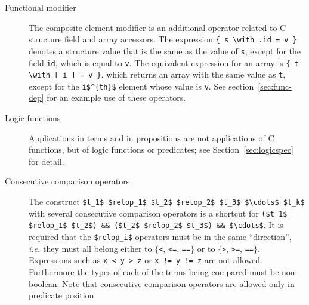 \begin{description}
\item[Functional modifier]
  The composite element modifier is an additional
  operator related to C structure field and array accessors.
  The expression \lstinline|{ s \with .id = v }|
  denotes a structure value that is the same as the value of \lstinline|s|, except for the field
  \lstinline|id|, which is equal to \lstinline|v|.
  The equivalent expression for an array is
  \lstinline|{ t \with [ i ] = v }|,
  which returns an array with the same value as \lstinline|t|, except for the
  \lstinline|i$^{th}$| element whose value
  is \lstinline|v|.
  See section~\ref{sec:func-dep} for an example use of these operators.

\item[Logic functions] Applications in terms and in propositions are not
applications of C functions, but of logic functions or predicates; see
Section~\ref{sec:logicspec} for detail.

\item[Consecutive comparison operators]
  The construct
\lstinline|$t_1$ $relop_1$ $t_2$ $relop_2$ $t_3$ $\cdots$ $t_k$| with
  several consecutive comparison operators is a shortcut for
  \lstinline|($t_1$ $relop_1$ $t_2$) && ($t_2$ $relop_2$ $t_3$) && $\cdots$|.
  It is required that the \lstinline|$relop_i$| operators must be in
  the same ``direction'', \emph{i.e.} they must all belong either to
  $\{$\lstinline|<|, \lstinline|<=|, \lstinline|==|$\}$ or to
  $\{$\lstinline|>|, \lstinline|>=|, \lstinline|==|$\}$. Expressions such as
  \lstinline|x < y > z| or \lstinline|x != y != z| are not allowed.
  Furthermore the types of each of the terms being compared must be non-boolean.
  Note that consecutive comparison operators are allowed only 
  in predicate position.
  
  \end{description}


